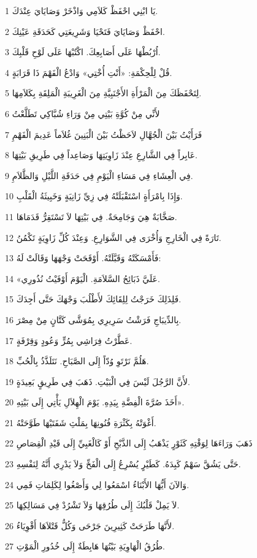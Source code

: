\par 1 يَا ابْنِي احْفَظْ كَلاَمِي وَاذْخَرْ وَصَايَايَ عِنْدَكَ.
\par 2 احْفَظْ وَصَايَايَ فَتَحْيَا وَشَرِيعَتِي كَحَدَقَةِ عَيْنِكَ.
\par 3 اُرْبُطْهَا عَلَى أَصَابِعِكَ. اكْتُبْهَا عَلَى لَوْحِ قَلْبِكَ.
\par 4 قُلْ لِلْحِكْمَةِ: «أَنْتِ أُخْتِي» وَادْعُ الْفَهْمَ ذَا قَرَابَةٍ.
\par 5 لِتَحْفَظَكَ مِنَ الْمَرْأَةِ الأَجْنَبِيَّةِ مِنَ الْغَرِيبَةِ الْمَلِقَةِ بِكَلاَمِهَا.
\par 6 لأَنِّي مِنْ كُوَّةِ بَيْتِي مِنْ وَرَاءِ شُبَّاكِي تَطَلَّعْتُ
\par 7 فَرَأَيْتُ بَيْنَ الْجُهَّالِ لاَحَظْتُ بَيْنَ الْبَنِينَ غُلاَماً عَدِيمَ الْفَهْمِ
\par 8 عَابِراً فِي الشَّارِعِ عِنْدَ زَاوِيَتِهَا وَصَاعِداً فِي طَرِيقِ بَيْتِهَا.
\par 9 فِي الْعِشَاءِ فِي مَسَاءِ الْيَوْمِ فِي حَدَقَةِ اللَّيْلِ وَالظَّلاَمِ.
\par 10 وَإِذَا بِامْرَأَةٍ اسْتَقْبَلَتْهُ فِي زِيِّ زَانِيَةٍ وَخَبِيثَةُ الْقَلْبِ.
\par 11 صَخَّابَةٌ هِيَ وَجَامِحَةٌ. فِي بَيْتِهَا لاَ تَسْتَقِرُّ قَدَمَاهَا.
\par 12 تَارَةً فِي الْخَارِجِ وَأُخْرَى فِي الشَّوَارِعِ. وَعِنْدَ كُلِّ زَاوِيَةٍ تَكْمُنُ.
\par 13 فَأَمْسَكَتْهُ وَقَبَّلَتْهُ. أَوْقَحَتْ وَجْهَهَا وَقَالَتْ لَهُ:
\par 14 «عَلَيَّ ذَبَائِحُ السَّلاَمَةِ. الْيَوْمَ أَوْفَيْتُ نُذُورِي.
\par 15 فَلِذَلِكَ خَرَجْتُ لِلِقَائِكَ لأَطْلُبَ وَجْهَكَ حَتَّى أَجِدَكَ.
\par 16 بِالدِّيبَاجِ فَرَشْتُ سَرِيرِي بِمُوَشَّى كَتَّانٍ مِنْ مِصْرَ.
\par 17 عَطَّرْتُ فِرَاشِي بِمُرٍّ وَعُودٍ وَقِرْفَةٍ.
\par 18 هَلُمَّ نَرْتَوِ وُدّاً إِلَى الصَّبَاحِ. نَتَلَذَّذُ بِالْحُبِّ.
\par 19 لأَنَّ الرَّجُلَ لَيْسَ فِي الْبَيْتِ. ذَهَبَ فِي طَرِيقٍ بَعِيدَةٍ.
\par 20 أَخَذَ صُرَّةَ الْفِضَّةِ بِيَدِهِ. يَوْمَ الْهِلاَلِ يَأْتِي إِلَى بَيْتِهِ».
\par 21 أَغْوَتْهُ بِكَثْرَةِ فُنُونِهَا بِمَلْثِ شَفَتَيْهَا طَوَّحَتْهُ.
\par 22 ذَهَبَ وَرَاءَهَا لِوَقْتِهِ كَثَوْرٍ يَذْهَبُ إِلَى الذَّبْحِ أَوْ كَالْغَبِيِّ إِلَى قَيْدِ الْقِصَاصِ
\par 23 حَتَّى يَشُقَّ سَهْمٌ كَبِدَهُ. كَطَيْرٍ يُسْرِعُ إِلَى الْفَخِّ وَلاَ يَدْرِي أَنَّهُ لِنَفْسِهِ.
\par 24 وَالآنَ أَيُّهَا الأَبْنَاءُ اسْمَعُوا لِي وَأَصْغُوا لِكَلِمَاتِ فَمِي.
\par 25 لاَ يَمِلْ قَلْبُكَ إِلَى طُرُقِهَا وَلاَ تَشْرُدْ فِي مَسَالِكِهَا.
\par 26 لأَنَّهَا طَرَحَتْ كَثِيرِينَ جَرْحَى وَكُلُّ قَتْلاَهَا أَقْوِيَاءُ.
\par 27 طُرُقُ الْهَاوِيَةِ بَيْتُهَا هَابِطَةٌ إِلَى خُدُورِ الْمَوْتِ.


